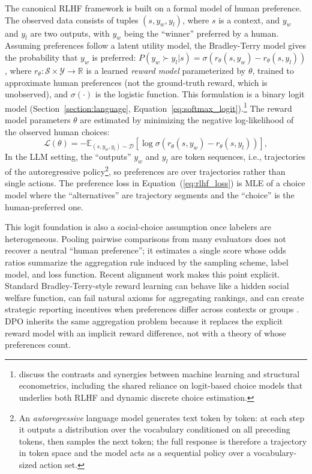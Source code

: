 The canonical RLHF framework is built on a formal model of human preference. The observed data consists of tuples $(s, y_w, y_l)$, where $s$ is a context, and $y_w$ and $y_l$ are two outputs, with $y_w$ being the ``winner'' preferred by a human. Assuming preferences follow a latent utility model, the Bradley-Terry model \citep{bradley1952rank} gives the probability that $y_w$ is preferred: $P(y_w \succ y_l | s) = \sigma(r_\theta(s, y_w) - r_\theta(s, y_l))$, where $r_\theta: \mathcal{S} \times \mathcal{Y} \to \mathbb{R}$ is a learned \textit{reward model} parameterized by $\theta$, trained to approximate human preferences (not the ground-truth reward, which is unobserved), and $\sigma(\cdot)$ is the logistic function. This formulation is a binary logit model (Section~\ref{section:language}, Equation~\ref{eq:softmax_logit}).\footnote{\citet{iskhakov2021} discuss the contrasts and synergies between machine learning and structural econometrics, including the shared reliance on logit-based choice models that underlies both RLHF and dynamic discrete choice estimation.} The reward model parameters $\theta$ are estimated by minimizing the negative log-likelihood of the observed human choices:
\begin{equation}
    \mathcal{L}(\theta) = -\mathbb{E}_{(s, y_w, y_l) \sim \mathcal{D}} \left[ \log \sigma \left( r_\theta(s, y_w) - r_\theta(s, y_l) \right) \right],
\label{eq:rlhf_loss}
\end{equation}
In the LLM setting, the ``outputs'' $y_w$ and $y_l$ are token sequences, i.e., trajectories of the autoregressive policy\footnote{An \emph{autoregressive} language model generates text token by token: at each step it outputs a distribution over the vocabulary conditioned on all preceding tokens, then samples the next token; the full response is therefore a trajectory in token space and the model acts as a sequential policy over a vocabulary-sized action set.}, so preferences are over trajectories rather than single actions. The preference loss in Equation~(\ref{eq:rlhf_loss}) is MLE of a choice model where the ``alternatives'' are trajectory segments and the ``choice'' is the human-preferred one.

This logit foundation is also a social-choice assumption once labelers are heterogeneous. Pooling pairwise comparisons from many evaluators does not recover a neutral ``human preference''; it estimates a single score whose odds ratios summarize the aggregation rule induced by the sampling scheme, label model, and loss function. Recent alignment work makes this point explicit. Standard Bradley-Terry-style reward learning can behave like a hidden social welfare function, can fail natural axioms for aggregating rankings, and can create strategic reporting incentives when preferences differ across contexts or groups \citep{conitzer2024socialchoice,siththaranjan2024distributional,ge2024axioms,park2024heterogeneous}. DPO inherits the same aggregation problem because it replaces the explicit reward model with an implicit reward difference, not with a theory of whose preferences count.


